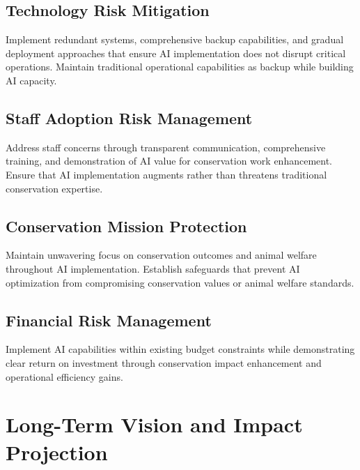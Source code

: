 \documentclass[
  Letterpaper,
]{scrbook}
\begin{document}
\subsection*{Technology Risk
Mitigation}\label{technology-risk-mitigation}

Implement redundant systems, comprehensive backup capabilities, and
gradual deployment approaches that ensure AI implementation does not
disrupt critical operations. Maintain traditional operational
capabilities as backup while building AI capacity.

\subsection*{Staff Adoption Risk
Management}\label{staff-adoption-risk-management}

Address staff concerns through transparent communication, comprehensive
training, and demonstration of AI value for conservation work
enhancement. Ensure that AI implementation augments rather than
threatens traditional conservation expertise.

\subsection*{Conservation Mission
Protection}\label{conservation-mission-protection}

Maintain unwavering focus on conservation outcomes and animal welfare
throughout AI implementation. Establish safeguards that prevent AI
optimization from compromising conservation values or animal welfare
standards.

\subsection*{Financial Risk Management}\label{financial-risk-management}

Implement AI capabilities within existing budget constraints while
demonstrating clear return on investment through conservation impact
enhancement and operational efficiency gains.

\section*{Long-Term Vision and Impact
Projection}\label{long-term-vision-and-impact-projection}
\end{document}

